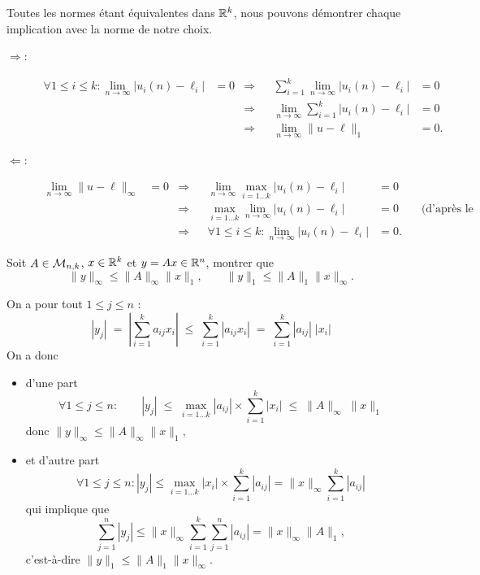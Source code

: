 Toutes les normes étant équivalentes dans $\mathbb{R}^k$, nous pouvons démontrer chaque implication avec la norme de notre choix.
\begin{description}
  \item[$\Rightarrow$:]
    \begin{align*}
      \forall 1 \leq i \leq k: \lim_{n \rightarrow \infty} |u_i(n) - \ell_i| & = 0 
      & \Rightarrow & & \sum_{i=1}^k \lim_{n \rightarrow \infty} |u_i(n) - \ell_i| & = 0 \\
      & & \Rightarrow & & \lim_{n \rightarrow \infty} \sum_{i=1}^k |u_i(n) - \ell_i| & = 0 \\
      & & \Rightarrow & &  \lim_{n \rightarrow \infty} \|u - \ell\|_1 & = 0. 
    \end{align*}
  \item[$\Leftarrow$:]
  \begin{align*}
    \lim_{n \rightarrow \infty} \|u - \ell\|_\infty & = 0
    & \Rightarrow & & \lim_{n \rightarrow \infty} \max_{i=1 \dots k} |u_i(n) - \ell_i| & = 0 \\
    & & \Rightarrow & & \max_{i=1 \dots k} \lim_{n \rightarrow \infty} |u_i(n) - \ell_i| & = 0 \qquad \text{(d'après le lemme)}\\
    & & \Rightarrow & & \forall 1 \leq i \leq k: \lim_{n \rightarrow \infty} |u_i(n) - \ell_i| & = 0.
  \end{align*}
\end{description} 
\eproof

\begin{proposition} \label{prop:normeProduitMatriceVecteur}
  Soit $A \in \mathcal{M}_{n, k}$, $x \in \mathbb{R}^k$ et $y = Ax \in \mathbb{R}^n$, montrer que 
  $$
  \|y\|_\infty \leq \|A\|_\infty \|x\|_1, \qquad
  \|y\|_1 \leq \|A\|_1 \|x\|_\infty.
  $$
\end{proposition}

On a pour tout $1 \leq j \leq n$ :
$$
|y_j| 
\; = \; \left|\sum_{i=1}^k a_{ij} x_i \right| 
\; \leq \; \sum_{i=1}^k |a_{ij} x_i| 
\; = \; \sum_{i=1}^k |a_{ij}| \; |x_i|
$$
On a donc
\begin{itemize}
  \item d'une part
  $$
  \forall 1 \leq j \leq n: \qquad |y_j| 
  \; \leq \; \max_{i=1 \dots k} |a_{ij}| \times \sum_{i=1}^k |x_i| 
  \; \leq \; \|A\|_\infty \; \|x\|_1
  $$
  donc $\|y\|_\infty \leq \|A\|_\infty \|x\|_1$,
  \item et d'autre part
  $$
  \forall 1 \leq j \leq n: |y_j| 
  \leq \max_{i=1 \dots k} |x_i| \times \sum_{i=1}^k |a_{ij}| = \|x\|_\infty \sum_{i=1}^k |a_{ij}| 
  $$
  qui implique que
  $$
  \sum_{j=1}^n |y_j| 
  \leq \|x\|_\infty \sum_{i=1}^k \sum_{j=1}^n |a_{ij}| = \|x\|_\infty \|A\|_1,
  $$
  c'est-à-dire $\|y\|_1 \leq \|A\|_1 \|x\|_\infty$.
\end{itemize}
\eproof

